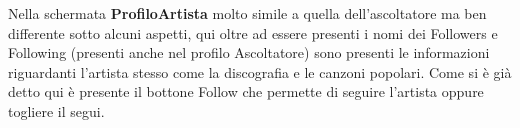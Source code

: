 \documentclass[11pt]{article}
\begin{document}
	Nella schermata \textbf{ProfiloArtista} molto simile a quella dell'ascoltatore ma ben differente sotto alcuni aspetti, qui oltre ad essere presenti i nomi dei Followers e Following (presenti anche nel profilo Ascoltatore) 
	sono presenti le informazioni riguardanti l'artista stesso come la discografia e le canzoni popolari.
	Come si è già detto qui è presente il bottone Follow che permette di seguire l'artista oppure togliere il segui. 
	\begin{figure}[h]
		\centering
	\end{figure}

	
\end{document}
